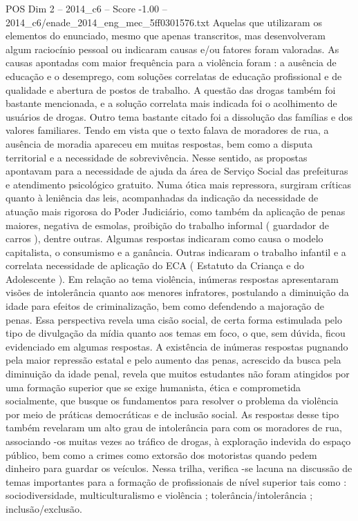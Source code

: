 \begin{textsample}{POS Dim 2 – 2014\_c6 – Score -1.00 – 2014\_c6/enade\_2014\_eng\_mec\_5ff0301576.txt}
Aquelas que utilizaram os elementos do enunciado, mesmo que apenas transcritos, mas desenvolveram algum raciocínio pessoal ou indicaram causas e/ou fatores foram valoradas.
As causas apontadas com maior frequência para a violência foram : a ausência de educação e o desemprego, com soluções correlatas de educação profissional e de qualidade e abertura de postos de trabalho.
A questão das drogas também foi bastante mencionada, e a solução correlata mais indicada foi o acolhimento de usuários de drogas.
Outro tema bastante citado foi a dissolução das famílias e dos valores familiares.
Tendo em vista que o texto falava de moradores de rua, a ausência de moradia apareceu em muitas respostas, bem como a disputa territorial e a necessidade de sobrevivência.
Nesse sentido, as propostas apontavam para a necessidade de ajuda da área de Serviço Social das prefeituras e atendimento psicológico gratuito.
Numa ótica mais repressora, surgiram críticas quanto à leniência das leis, acompanhadas da indicação da necessidade de atuação mais rigorosa do Poder Judiciário, como também da aplicação de penas maiores, negativa de esmolas, proibição do trabalho informal ( guardador de carros ), dentre outras.
Algumas respostas indicaram como causa o modelo capitalista, o consumismo e a ganância.
Outras indicaram o trabalho infantil e a correlata necessidade de aplicação do ECA ( Estatuto da Criança e do Adolescente ).
Em relação ao tema violência, inúmeras respostas apresentaram visões de intolerância quanto aos menores infratores, postulando a diminuição da idade para efeitos de criminalização, bem como defendendo a majoração de penas.
Essa perspectiva revela uma cisão social, de certa forma estimulada pelo tipo de divulgação da mídia quanto aos temas em foco, o que, sem dúvida, ficou evidenciado em algumas respostas.
A existência de inúmeras respostas pugnando pela maior repressão estatal e pelo aumento das penas, acrescido da busca pela diminuição da idade penal, revela que muitos estudantes não foram atingidos por uma formação superior que se exige humanista, ética e comprometida socialmente, que busque os fundamentos para resolver o problema da violência por meio de práticas democráticas e de inclusão social.
As respostas desse tipo também revelaram um alto grau de intolerância para com os moradores de rua, associando -os muitas vezes ao tráfico de drogas, à exploração indevida do espaço público, bem como a crimes como extorsão dos motoristas quando pedem dinheiro para guardar os veículos.
Nessa trilha, verifica -se lacuna na discussão de temas importantes para a formação de profissionais de nível superior tais como : sociodiversidade, multiculturalismo e violência ; tolerância/intolerância ; inclusão/exclusão.

\end{textsample}
